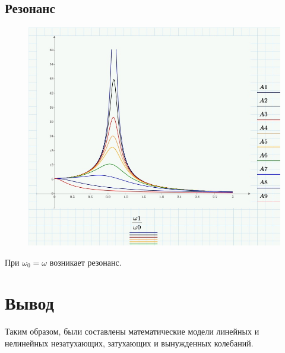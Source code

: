 \documentclass[a4paper, 14pt]{extarticle}
\begin{document}
		\subsection{Резонанс}
		\begin{figure}[H]
			\centering
			\includegraphics[width = \linewidth]{18.jpg}
		\end{figure}
		При $\omega_0 = \omega$ возникает резонанс.
		
	\section{Вывод}
		Таким образом, были составлены математические модели линейных и нелинейных незатухающих, затухающих и вынужденных колебаний. 
		
\end{document}
